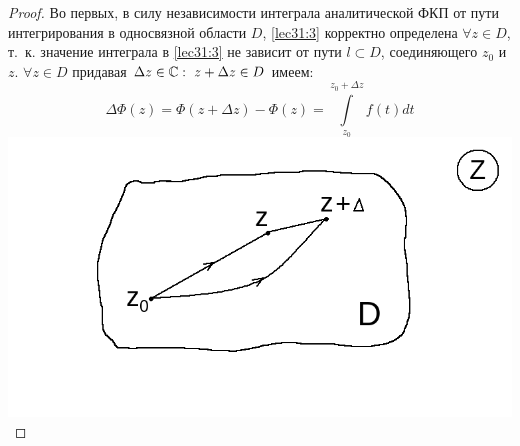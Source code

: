 \documentclass[../../main.tex]{subfiles}
\begin{document}
\begin{proof}
	Во первых, в силу независимости интеграла аналитической ФКП от пути
	интегрирования в односвязной области $D$, \eqref{lec31:3} корректно
	определена $\forall z \in D$, т.~к. значение интеграла в
	\eqref{lec31:3} не зависит от пути $l \subset D$, соединяющего $z_0$
	и $z$. $\forall z \in D$ придавая $\Delta z \in \mathbb{C} : \ z + \Delta z
	\in D$ имеем:
	\begin{equation}
		\label{lec31:4}
		\Delta \Phi(z) = \Phi(z + \Delta z) - \Phi(z) =
		\int\limits_{z_0}^{z_0 + \Delta z} f(t) dt
	\end{equation}
	\includegraphics[scale = 0.3]{lec31_4.png}


\end{proof}
\end{document}
